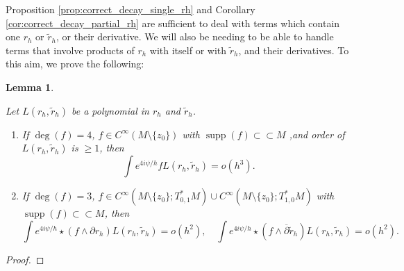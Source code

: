 \documentclass[12pt]{amsart}
\def\p{\partial}
\DeclareMathOperator{\supp}{supp}
\newtheorem{lemma}[theorem]{Lemma}
\theoremstyle{definition}
\theoremstyle{remark}
\newcommand{\tbl}[1]{\textcolor{blue}{#1}}
\newcommand{\eps}{\epsilon}
\newcommand{\f}[1]{\footnote{\tbl{#1}}}
\newcommand{\op}{\overline \p}
\begin{document}
Proposition \ref{prop:correct_decay_single_rh} and Corollary \ref{cor:correct_decay_partial_rh} are sufficient to deal with terms which contain one $r_h$ or $\tilde r_h$, or their derivative. We will also be needing to be able to handle terms that involve products of $r_h$ with itself or with $\tilde r_h$, and their derivatives. To this aim, we prove the following:
{\color{black}
\begin{lemma}\label{lem:polynomial_rh_estims}
 
  Let $L(r_h,\tilde r_h)$ be a polynomial in $r_h$ and $\tilde r_h$. %
  \begin{enumerate}
   \item[(1)] If $\deg(f)=4$, $f\in C^\infty(M\setminus\{z_0\})$ with $\supp(f) \subset\subset M$ ,and order of $L(r_h,\tilde r_h)$ is $\geq 1$, then \[ \int e^{4i\psi/h}f L(r_h,\tilde r_h)=o(h^3).
  \]
  \item[(2)] If $\deg(f)=3$, $f\in C^\infty(M\setminus \{z_0\}; T^*_{0,1}M)\cup C^\infty(M\setminus \{z_0\}; T^*_{1,0}M)$ with $\supp(f) \subset\subset M$, then  
  \[
  \int e^{4i\psi/h}\star\left(f \wedge\p r_h\right)L(r_h,\tilde r_h)=o(h^2), \quad  \int e^{4i\psi/h}\star\left(f \wedge\op \tilde r_h\right) L(r_h,\tilde r_h)=o(h^2).
  \]
 \end{enumerate}
\end{lemma}
\begin{proof}


\end{proof}}
\end{document}
